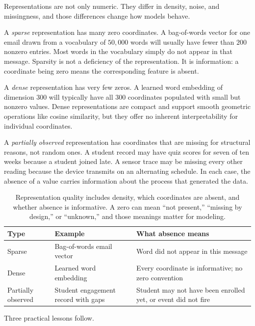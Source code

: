Representations are not only numeric. They differ in density, noise, and missingness, and those differences change how models behave.

A \emph{sparse} representation has many zero coordinates. A bag-of-words vector for one email drawn from a vocabulary of $50{,}000$ words will usually have fewer than $200$ nonzero entries. Most words in the vocabulary simply do not appear in that message. Sparsity is not a deficiency of the representation. It is information: a coordinate being zero means the corresponding feature is absent.

A \emph{dense} representation has very few zeros. A learned word embedding of dimension $300$ will typically have all $300$ coordinates populated with small but nonzero values. Dense representations are compact and support smooth geometric operations like cosine similarity, but they offer no inherent interpretability for individual coordinates.

A \emph{partially observed} representation has coordinates that are missing for structural reasons, not random ones. A student record may have quiz scores for seven of ten weeks because a student joined late. A sensor trace may be missing every other reading because the device transmits on an alternating schedule. In each case, the absence of a value carries information about the process that generated the data.

\begin{table}[t]
\centering
\small
\setlength{\tabcolsep}{4pt}
\begin{tabular}{p{1.89cm}p{3.26cm}p{4.8cm}}
\toprule
Type & Example & What absence means \\
\midrule
Sparse & Bag-of-words email vector & Word did not appear in this message \\
Dense & Learned word embedding & Every coordinate is informative; no zero convention \\
Partially observed & Student engagement record with gaps & Student may not have been enrolled yet, or event did not fire \\
\bottomrule
\end{tabular}
\caption{Representation quality includes density, which coordinates are absent, and whether absence is informative. A zero can mean ``not present,'' ``missing by design,'' or ``unknown,'' and those meanings matter for modeling.}
\label{tab:sparse-dense-missing}
\end{table}

Three practical lessons follow.


